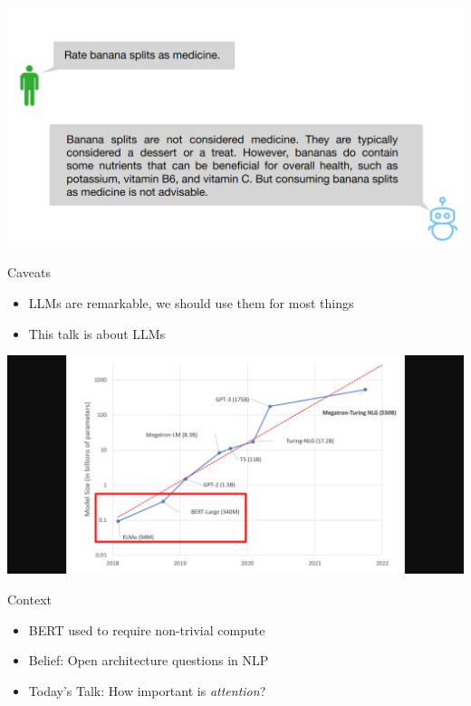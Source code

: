 \documentclass[14pt,aspectratio=169]{beamer}
\begin{document}
\begin{frame}
    \includegraphics[width=\textwidth]{Figs/Banana.png}
\end{frame}






\begin{frame}{Caveats}
    \begin{itemize}
        \item LLMs are remarkable, we should use them for most things
        \item This talk is  about LLMs 
    \end{itemize}
\end{frame}




\begin{frame}
    \includegraphics[trim={10cm 0 10cm 0}, clip, height=\textheight]{Figs/ModelSize3.png}
\end{frame}

\begin{frame}{Context}
    \begin{itemize}
        \item BERT used to require non-trivial compute 
        \item Belief: Open architecture questions in NLP
        \item Today's Talk: How important is \textit{attention}?
    \end{itemize}
\end{frame}
\end{document}
